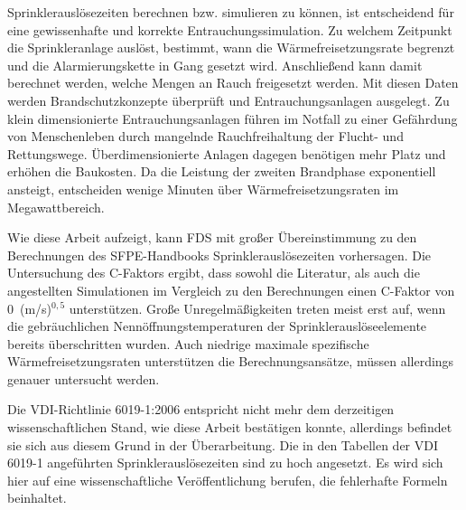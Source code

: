 \begin{comment}
Bei der Entstehung dieser Arbeit wird ein zweiter Vergleich mit den Berechnungen des SFPE-Handbooks gezogen, da diese die aktuellen Berechnungsansätze für Sprinklerauslösezeiten beinhalten. FDS liefert eine überzeugende Übereinstimmung der Sprinklerauslösezeiten zu den Berechnungen. Abweichungen betragen meist nur wenige Sekunden. Große Unregelmäßigkeiten treten meist erst auf, wenn die gebräuchlichen Nennöffnungstemperaturen der Sprinklerauslöselemente bereits überschritten wurden. Auch niedrige maximale spezifische Wärmefreisetzungsraten unterstützen die Berechnungsansätze, müssen allerdings genauer untersucht werden. Diese Arbeit zeigt auf, dass FDS in der Lage ist, Sprinklerauslösezeiten zufriedenstellend vorherzusagen.  
\end{comment}

Sprinklerauslösezeiten berechnen bzw. simulieren zu können, ist entscheidend für eine gewissenhafte und korrekte Entrauchungssimulation. Zu welchem Zeitpunkt die Sprinkleranlage auslöst, bestimmt, wann die Wärmefreisetzungsrate begrenzt und die Alarmierungskette in Gang gesetzt wird. Anschließend kann damit berechnet werden, welche Mengen an Rauch freigesetzt werden. Mit diesen Daten werden Brandschutzkonzepte überprüft und Entrauchungsanlagen ausgelegt. Zu klein dimensionierte Entrauchungsanlagen führen im Notfall zu einer Gefährdung von Menschenleben durch mangelnde Rauchfreihaltung der Flucht- und Rettungswege. Überdimensionierte Anlagen dagegen benötigen mehr Platz und erhöhen die Baukosten. Da die Leistung der zweiten Brandphase exponentiell ansteigt, entscheiden wenige Minuten über Wärmefreisetzungsraten im Megawattbereich.

Wie diese Arbeit aufzeigt, kann FDS mit großer Übereinstimmung zu den Berechnungen des SFPE-Handbooks Sprinklerauslösezeiten vorhersagen. Die Untersuchung des C-Faktors ergibt, dass sowohl die Literatur, als auch die angestellten Simulationen im Vergleich zu den Berechnungen einen C-Faktor von 0~(m/s)$^{0,5}$ unterstützen.
Große Unregelmäßigkeiten treten meist erst auf, wenn die gebräuchlichen Nenn\-öff\-nungs\-tem\-pe\-ra\-tur\-en der Sprinklerauslöseelemente bereits überschritten wurden. Auch niedrige maximale spezifische Wärmefreisetzungsraten unterstützen die Berechnungsansätze, müssen allerdings genauer untersucht werden. 

Die VDI-Richtlinie 6019-1:2006 entspricht nicht mehr dem derzeitigen wissenschaftlichen Stand, wie diese Arbeit bestätigen konnte, allerdings befindet sie sich aus diesem Grund in der Überarbeitung. Die in den Tabellen der VDI 6019-1 angeführten Sprinklerauslösezeiten sind zu hoch angesetzt. Es wird sich hier auf eine wissenschaftliche Veröffentlichung berufen, die fehlerhafte Formeln beinhaltet.


